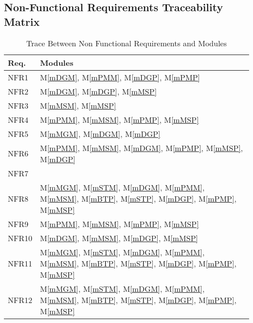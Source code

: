 \documentclass[12pt, titlepage]{article}
\newcommand{\mref}[1]{M\ref{#1}}
\begin{document}
\newpage

\subsection{Non-Functional Requirements Traceability Matrix}
\begin{table}[H]
\centering
\begin{tabular}{p{} p{}}
\toprule
\textbf{Req.} & \textbf{Modules}\\
\midrule
NFR1 & \mref{mDGM}, \mref{mPMM}, \mref{mDGP}, \mref{mPMP}\\
NFR2 & \mref{mDGM}, \mref{mDGP}, \mref{mMSP}\\
NFR3 & \mref{mMSM}, \mref{mMSP}\\
NFR4 & \mref{mPMM}, \mref{mMSM}, \mref{mPMP}, \mref{mMSP}\\
NFR5 & \mref{mMGM}, \mref{mDGM}, \mref{mDGP}\\
NFR6 & \mref{mPMM}, \mref{mMSM}, \mref{mDGM}, \mref{mPMP}, \mref{mMSP}, \mref{mDGP}\\
NFR7 & \\
NFR8 & \mref{mMGM}, \mref{mSTM}, \mref{mDGM}, \mref{mPMM}, \mref{mMSM}, \mref{mBTP}, \mref{mSTP}, \mref{mDGP}, \mref{mPMP}, \mref{mMSP}\\
NFR9 & \mref{mPMM}, \mref{mMSM}, \mref{mPMP}, \mref{mMSP}\\
NFR10 & \mref{mDGM}, \mref{mMSM}, \mref{mDGP}, \mref{mMSP}\\
NFR11 & \mref{mMGM}, \mref{mSTM}, \mref{mDGM}, \mref{mPMM}, \mref{mMSM}, \mref{mBTP}, \mref{mSTP}, \mref{mDGP}, \mref{mPMP}, \mref{mMSP}\\
NFR12 & \mref{mMGM}, \mref{mSTM}, \mref{mDGM}, \mref{mPMM}, \mref{mMSM}, \mref{mBTP}, \mref{mSTP}, \mref{mDGP}, \mref{mPMP}, \mref{mMSP}\\
\bottomrule
\end{tabular}
\caption{Trace Between Non Functional Requirements and Modules}
\label{TblNFRT}
\end{table}
\end{document}
